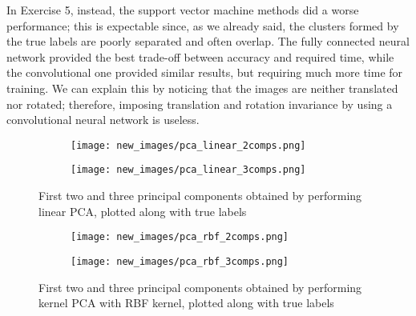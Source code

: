 \documentclass[12pt]{article}
\begin{document}
	In Exercise 5, instead, the support vector machine methods did a worse performance; this is expectable since, as we already said, the clusters formed by the true labels are poorly separated and often overlap. The fully connected neural network provided the best trade-off between accuracy and required time, while the convolutional one provided similar results, but requiring much more time for training. We can explain this by noticing that the images are neither translated nor rotated; therefore, imposing translation and rotation invariance by using a convolutional neural network is useless.
	
	
	\begin{figure}[h]
		\begin{subfigure}{0.5\textwidth}
			\texttt{[image: new\_images/pca\_linear\_2comps.png]}
			\caption{}
			\label{subfig:pca_linear_2comps}
		\end{subfigure}
		\begin{subfigure}{0.5\textwidth}
			\texttt{[image: new\_images/pca\_linear\_3comps.png]}
			\caption{}
			\label{subfig:lpca_linear_3comps}
		\end{subfigure}
		\caption{First two and three principal components obtained by performing linear PCA, plotted along with true labels}
		\label{fig:pca_linear}
	\end{figure}
	\hfill
	\begin{figure}[h]
		\begin{subfigure}{0.5\textwidth}
			\texttt{[image: new\_images/pca\_rbf\_2comps.png]}
			\caption{}
			\label{subfig:pca_rbf_2comps}
		\end{subfigure}
		\begin{subfigure}{0.5\textwidth}
			\texttt{[image: new\_images/pca\_rbf\_3comps.png]}
			\caption{}
			\label{subfig:pca_rbf_3comps}
		\end{subfigure}
		\caption{First two and three principal components obtained by performing kernel PCA with RBF kernel, plotted along with true labels}
		\label{fig:pca_rbf}
	\end{figure}
	\hfill
\end{document}
